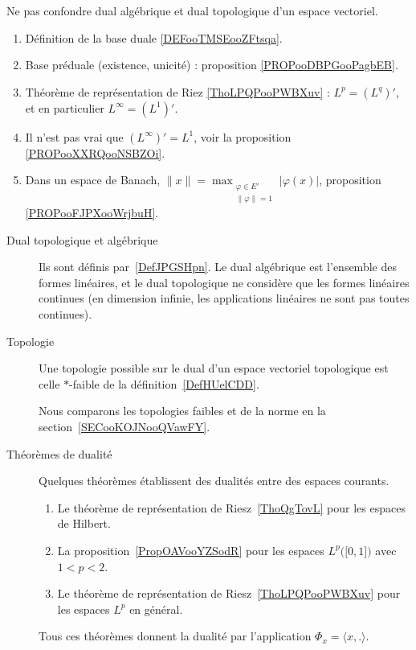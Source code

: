 
     \label{THEMEooULGFooPscFJC}

Ne pas confondre dual algébrique et dual topologique d'un espace vectoriel.

\begin{enumerate}
	\item
	      Définition de la base duale \ref{DEFooTMSEooZFtsqa}.
	\item
	      Base préduale (existence, unicité) : proposition \ref{PROPooDBPGooPagbEB}.
	\item
	      Théorème de représentation de Riez \ref{ThoLPQPooPWBXuv} : \( L^p=(L^q)'\), et en particulier \( L^{\infty}=(L^1)'\).
	\item
	      Il n'est pas vrai que \( (L^{\infty})'=L^1\), voir la proposition \ref{PROPooXXRQooNSBZOi}.
      \item
          Dans un espace de Banach, \( \| x \|=\max_{\substack{\varphi\in E'\\\| \varphi \|=1}}| \varphi(x) |\), proposition \ref{PROPooFJPXooWrjbuH}.
\end{enumerate}

\begin{description}
	\item[Dual topologique et algébrique]
	      Ils sont définis par~\ref{DefJPGSHpn}. Le dual algébrique est l'ensemble des formes linéaires, et le dual topologique ne considère que les formes linéaires continues (en dimension infinie, les applications linéaires ne sont pas toutes continues).
	\item[Topologie]
	      Une topologie possible sur le dual d'un espace vectoriel topologique est celle \( *\)-faible de la définition~\ref{DefHUelCDD}.

	      Nous comparons les topologies faibles et de la norme en la section~\ref{SECooKOJNooQVawFY}.
	\item[Théorèmes de dualité]
	      Quelques théorèmes établissent des dualités entre des espaces courants.
	      \begin{enumerate}
		      \item
		            Le théorème de représentation de Riesz~\ref{ThoQgTovL} pour les espaces de Hilbert.
		      \item
		            La proposition~\ref{PropOAVooYZSodR} pour les espaces \( L^p\big( \mathopen[ 0 , 1 \mathclose] \big)\) avec \( 1<p<2\).
		      \item
		            Le théorème de représentation de Riesz~\ref{ThoLPQPooPWBXuv} pour les espaces \( L^p\) en général.
	      \end{enumerate}
	      Tous ces théorèmes donnent la dualité par l'application \( \Phi_x=\langle x, .\rangle \).

\end{description}
